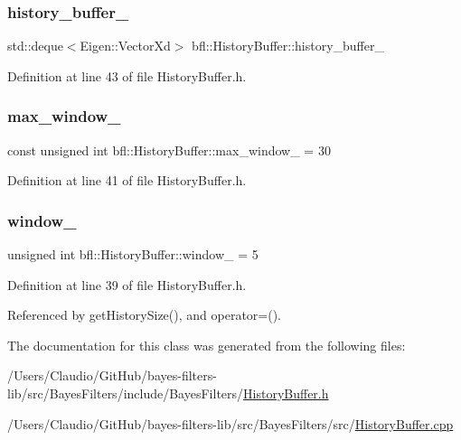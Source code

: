 \subsubsection{\texorpdfstring{history\+\_\+buffer\+\_\+}{history\_buffer\_}}
{\footnotesize\ttfamily std\+::deque$<$Eigen\+::\+Vector\+Xd$>$ bfl\+::\+History\+Buffer\+::history\+\_\+buffer\+\_\+\hspace{0.3cm}{\ttfamily [private]}}



Definition at line 43 of file History\+Buffer.\+h.

\mbox{\label{classbfl_1_1HistoryBuffer_aeb4d2b9c58f06177b0daaf640e2b6c9e}} 
\subsubsection{\texorpdfstring{max\+\_\+window\+\_\+}{max\_window\_}}
{\footnotesize\ttfamily const unsigned int bfl\+::\+History\+Buffer\+::max\+\_\+window\+\_\+ = 30\hspace{0.3cm}{\ttfamily [private]}}



Definition at line 41 of file History\+Buffer.\+h.

\mbox{\label{classbfl_1_1HistoryBuffer_a135dd1829747ba2f414f12fd8282f75a}} 
\subsubsection{\texorpdfstring{window\+\_\+}{window\_}}
{\footnotesize\ttfamily unsigned int bfl\+::\+History\+Buffer\+::window\+\_\+ = 5\hspace{0.3cm}{\ttfamily [private]}}



Definition at line 39 of file History\+Buffer.\+h.



Referenced by get\+History\+Size(), and operator=().



The documentation for this class was generated from the following files\+:\begin{DoxyCompactItemize}
\item 
/\+Users/\+Claudio/\+Git\+Hub/bayes-\/filters-\/lib/src/\+Bayes\+Filters/include/\+Bayes\+Filters/\mbox{\hyperlink{HistoryBuffer_8h}{History\+Buffer.\+h}}\item 
/\+Users/\+Claudio/\+Git\+Hub/bayes-\/filters-\/lib/src/\+Bayes\+Filters/src/\mbox{\hyperlink{HistoryBuffer_8cpp}{History\+Buffer.\+cpp}}\end{DoxyCompactItemize}
